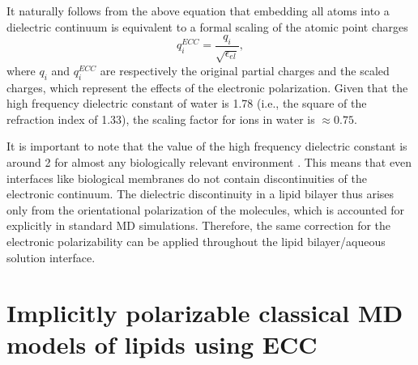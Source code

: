 It naturally follows from the above equation that 
embedding all atoms into a dielectric continuum 
is equivalent to a formal scaling of the atomic point charges 
\begin{equation}  \label{eq:scaling}
 q_i ^{ECC} = \frac{q_i}{\sqrt{\epsilon _{el}}} ,
\end{equation} 
where $q_i$ and $q_i^{ECC}$ are respectively the original partial charges and the scaled charges, 
which represent the effects of the electronic polarization. 
Given that the  high frequency dielectric constant of water is 1.78 (i.e., the square of the refraction index of 1.33), 
the scaling factor for ions in water is $\approx 0.75$. 

It is important to note that the value of the high frequency dielectric constant  
is around 2 for almost any biologically relevant environment \citep{leontyev11}. 
This means that even interfaces like biological membranes do not contain discontinuities of the electronic continuum. 
The dielectric discontinuity in a lipid bilayer thus arises only 
from the orientational polarization of the molecules, which is accounted for explicitly in standard MD simulations.  
Therefore, the same correction for the electronic polarizability can be  
applied throughout the lipid bilayer/aqueous solution interface. 




 

 
 



\section{Implicitly polarizable classical MD models of lipids using ECC}
\label{section:ecc-lipids}


